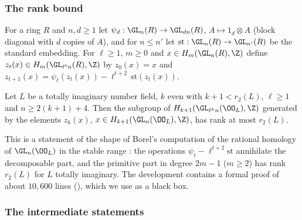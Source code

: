 \subsubsection{The rank bound}

For a ring $R$ and $n,d\ge1$ let $\psi_d:\GL_n(R)\to\GL_{dn}(R)$, $A\mapsto1_d\otimes A$ (block diagonal with $d$ copies of $A$), and for
$n\le n'$ let $\mathrm{st}:\GL_n(R)\to\GL_{n'}(R)$ be the standard embedding. For $\ell\ge1$, $m\ge0$ and $x\in H_m(\GL_n(R),\Z)$ define
$z_t(x)\in H_m(\GL_{\ell^tn}(R),\Z)$ by $z_0(x)=x$ and $z_{t+1}(x)=\psi_\ell(z_t(x))-\ell^{t+2}\,\mathrm{st}(z_t(x))$.

\begin{theorem}\label{pf:vwin:bodd}
Let $L$ be a totally imaginary number field, $k$ even with $k+1<r_2(L)$, $\ell\ge1$ and $n\ge2(k+1)+4$. Then the subgroup of
$H_{k+1}(\GL_{\ell^kn}(\OO_L),\Z)$ generated by the elements $z_k(x)$, $x\in H_{k+1}(\GL_n(\OO_L),\Z)$, has rank at most $r_2(L)$.
\end{theorem}

This is a statement of the shape of Borel's computation of the rational homology of $\GL_n(\OO_L)$ in the stable range \cite{Borel1974}:
the operations $\psi_\ell-\ell^{t+2}\mathrm{st}$ annihilate the decomposable part, and the primitive part in degree $2m-1$ ($m\ge2$) has
rank $r_2(L)$ for $L$ totally imaginary. The development contains a formal proof of about $10{,}600$ lines
(), which we use as a black box.

\subsubsection{The intermediate statements}

